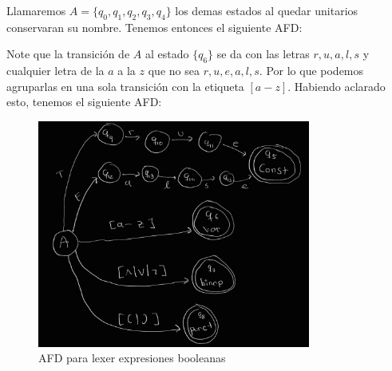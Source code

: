Llamaremos $A=\{q_0, q_1, q_2, q_3, q_4\}$ los demas estados al quedar unitarios conservaran su nombre. Tenemos entonces el siguiente AFD:


Note que la transición de $A$ al estado $\{q_6\}$ se da con las letras $r, u, a, l, s$ y cualquier letra de la $a$ a la $z$ que no sea $r, u, e, a, l, s$. Por lo que podemos agruparlas en una sola transición con la etiqueta $[a-z]$. Habiendo aclarado esto, tenemos el siguiente AFD:


\begin{figure}[h!]
    \centering
    \includegraphics[width=0.8\textwidth]{images/ejercicio10-2.jpg}
    \caption{AFD para lexer expresiones booleanas}
    \label{fig:my_label}
\end{figure}


